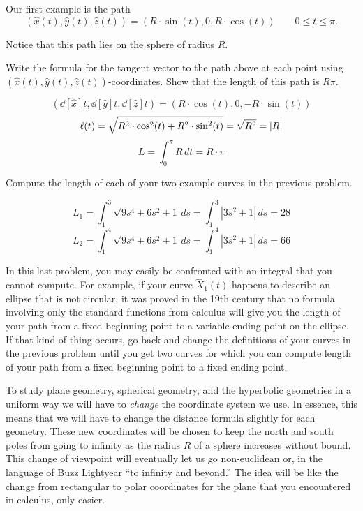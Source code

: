 \documentclass{ximera}
\begin{document}
Our first example is the path%
\[
\left(\hat{x}(t),\hat{y}(t),\hat{z}(t)\right)=\left(R\cdot\sin(t),0,R\cdot\cos(t)\right) \qquad
0 \leq t\leq\pi.
\]


Notice that this path lies on the sphere of radius $R$.

\begin{problem}
Write the formula for the tangent vector to the path above at each
point using
$\left(\hat{x}(t),\hat{y}(t),\hat{z}(t)\right)$-coordinates. Show that
the length of this path is $R\pi$.

\begin{freeResponse}
\[
\left( \dd[\hat{x}]{t}, \dd[\hat{y}]{t}, \dd[\hat{z}]{t} \right) 
    = \left(R\cdot\cos(t),0,-R\cdot\sin(t) \right)
\]
\[
\ell(t) = \sqrt{
   R^2 \cdot\cos^{2}(t) + R^2 \cdot\sin^{2}(t)} 
   = \sqrt{R^2} = |R|
\]
\[
L=\int_{0}^{\pi} R \,dt = R\cdot\pi
\]
\end{freeResponse}

\end{problem}

\begin{problem}
Compute the length of each of your two example curves in the previous
problem.

\begin{freeResponse}
\[
L_{1}= \int_{1}^{3}  \sqrt{9s^4 + 6s^2 +1} \,ds = \int_{1}^{3} |3s^2 +1| \, ds = 28
\]
\[
L_{2}= \int_{1}^{4}  \sqrt{9s^4 + 6s^2 +1} \,ds = \int_{1}^{4} |3s^2 +1| \, ds = 66
\]
\end{freeResponse}

\end{problem}

\begin{remark}
In this last problem, you may easily be confronted with an integral
that you cannot compute. For example, if your curve $\hat{X}_{1}\left(
t\right) $ happens to describe an ellipse that is not circular, it was
proved in the 19th century that no formula involving only the
standard functions from calculus will give you the length of your path
from a fixed beginning point to a variable ending point on the
ellipse. If that kind of thing occurs, go back and change the
definitions of your curves in the previous problem until you get two
curves for which you can compute length of your path from a fixed
beginning point to a fixed ending point. %
\end{remark}





To study plane geometry, spherical geometry, and the hyperbolic
geometries in a uniform way we will have to \textit{change} the
coordinate system we use. In essence, this means that we will have to
change the distance formula slightly for each geometry. These new
coordinates will be chosen to keep the north and south poles from
going to infinity as the radius $R$ of a sphere increases without
bound. This change of viewpoint will eventually let us go
non-euclidean or, in the language of Buzz Lightyear ``to infinity and
beyond.'' The idea will be like the change from rectangular to polar
coordinates for the plane that you encountered in calculus, only
easier.
\end{document}
